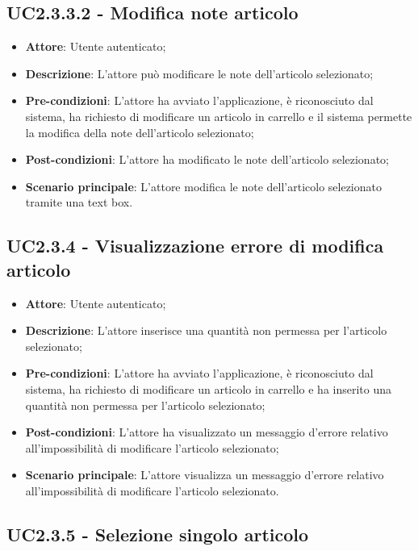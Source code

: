 \subsection{UC2.3.3.2 - Modifica note articolo}

\begin{itemize}
	\item \textbf{Attore}: Utente autenticato;
	\item \textbf{Descrizione}: L'attore può modificare le note dell'articolo selezionato;
	\item \textbf{Pre-condizioni}: L'attore ha avviato l'applicazione, è riconosciuto dal sistema, ha richiesto di modificare un articolo in carrello e il sistema permette la modifica della note dell'articolo selezionato;
	\item \textbf{Post-condizioni}: L'attore ha modificato le note dell'articolo selezionato;
	\item \textbf{Scenario principale}: L'attore modifica le note dell'articolo selezionato tramite una text box.
\end{itemize}

\subsection{UC2.3.4 - Visualizzazione errore di modifica articolo}

\begin{itemize}
	\item \textbf{Attore}: Utente autenticato;
	\item \textbf{Descrizione}: L'attore inserisce una quantità non permessa per l'articolo selezionato;
	\item \textbf{Pre-condizioni}: L'attore ha avviato l'applicazione, è riconosciuto dal sistema, ha richiesto di modificare un articolo in carrello e ha inserito una quantità non permessa per l'articolo selezionato;
	\item \textbf{Post-condizioni}: L'attore ha visualizzato un messaggio d'errore relativo all'impossibilità di modificare l'articolo selezionato;
	\item \textbf{Scenario principale}: L'attore visualizza un messaggio d'errore relativo all'impossibilità di modificare l'articolo selezionato.
\end{itemize}

\subsection{UC2.3.5 - Selezione singolo articolo}

